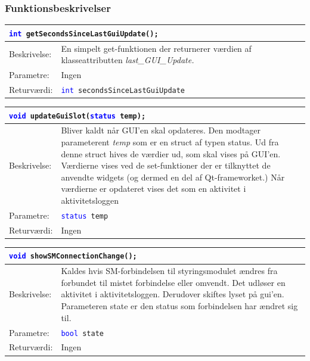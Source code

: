 \subsubsection{Funktionsbeskrivelser}
 
\begin{table}[H]
\begin{tabular}{l p{12.5cm}}
\multicolumn{2}{l}{\texttt{\textcolor{blue}{int} getSecondsSinceLastGuiUpdate();}} \\
\hline
Beskrivelse:& En simpelt get-funktionen der returnerer værdien af klasseattributten \textit{last\_GUI\_Update.} \\
Parametre:&Ingen\\
Returværdi:&\texttt{\textcolor{blue}{int} secondsSinceLastGuiUpdate}\\
\end{tabular}
\end{table}

\begin{table}[H]
\begin{tabular}{l p{12.5cm}}
\multicolumn{2}{l}{\texttt{\textcolor{blue}{void} updateGuiSlot(\textcolor{blue}{status} temp);}} \\
\hline
Beskrivelse:& Bliver kaldt når GUI'en skal opdateres. 
Den modtager parameterent \textit{temp} som er en struct af typen status. 
Ud fra denne struct hives de værdier ud, som skal vises på GUI'en. Værdierne vises ved de set-funktioner der er tilknyttet de anvendte widgets (og dermed en del af Qt-frameworket.) 
Når værdierne er opdateret vises det som en aktivitet i aktivitetsloggen \\   
Parametre:&\texttt{\textcolor{blue}{status} temp}\\
Returværdi:&Ingen\\
\end{tabular}
\end{table}

\begin{table}[H]
\begin{tabular}{l p{12.5cm}}
\multicolumn{2}{l}{\texttt{\textcolor{blue}{void} showSMConnectionChange();}} \\
\hline
Beskrivelse:& Kaldes hvis SM-forbindelsen til styringsmodulet ændres fra forbundet til mistet forbindelse eller omvendt. Det udløser en aktivitet i aktivitetsloggen. Derudover skiftes lyset på gui'en. Parameteren state er den status som forbindelsen har ændret sig til.\\   
Parametre:&\texttt{\textcolor{blue}{bool} state}\\
Returværdi:&Ingen\\
\end{tabular}
\end{table}

